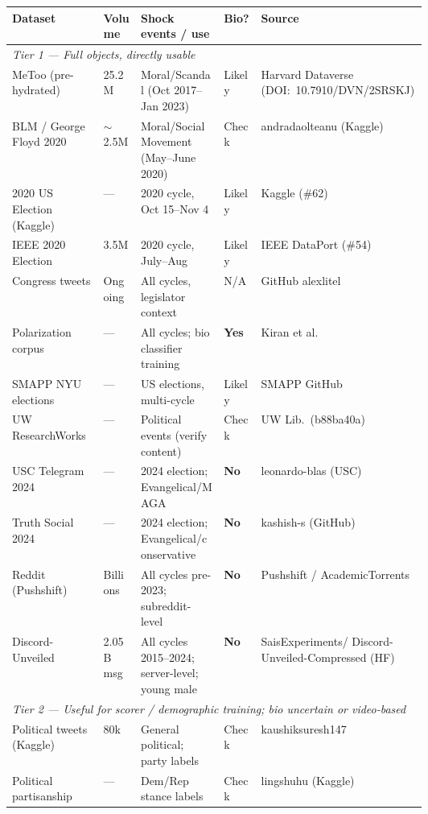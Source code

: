 \documentclass[11pt]{article}
\begin{document}
\begin{center}
{\small\setlength{\tabcolsep}{4pt}%
\begin{tabularx}{\linewidth}{p{0.22\linewidth}p{0.09\linewidth}p{0.20\linewidth}p{0.09\linewidth}X}
\toprule
\textbf{Dataset} & \textbf{Volume} & \textbf{Shock events / use} & \textbf{Bio?} & \textbf{Source} \\
\midrule
\multicolumn{5}{l}{\small\textit{Tier 1 --- Full objects, directly usable}} \\[2pt]
MeToo (pre-hydrated) & 25.2M & Moral/Scandal (Oct 2017--Jan 2023) & Likely & Harvard Dataverse (DOI:~10.7910/DVN/2SRSKJ) \\
BLM / George Floyd 2020 & $\sim$2.5M & Moral/Social Movement (May--June 2020) & Check & andradaolteanu (Kaggle) \\
2020 US Election (Kaggle) & --- & 2020 cycle, Oct 15--Nov 4 & Likely & Kaggle (\#62) \\
IEEE 2020 Election & 3.5M & 2020 cycle, July--Aug & Likely & IEEE DataPort (\#54) \\
Congress tweets & Ongoing & All cycles, legislator context & N/A & GitHub alexlitel \\
Polarization corpus & --- & All cycles; bio classifier training & \textbf{Yes} & Kiran et al. \\
SMAPP NYU elections & --- & US elections, multi-cycle & Likely & SMAPP GitHub \\
UW ResearchWorks & --- & Political events (verify content) & Check & UW Lib.\ (b88ba40a) \\
USC Telegram 2024 & --- & 2024 election; Evangelical/MAGA & \textbf{No} & leonardo-blas (USC) \\
Truth Social 2024 & --- & 2024 election; Evangelical/conservative & \textbf{No} & kashish-s (GitHub) \\
Reddit (Pushshift) & Billions & All cycles pre-2023; subreddit-level & \textbf{No} & Pushshift / AcademicTorrents \\
Discord-Unveiled & 2.05B msg & All cycles 2015--2024; server-level; young male & \textbf{No} & SaisExperiments/ Discord-Unveiled-Compressed (HF) \\[4pt]
\multicolumn{5}{l}{\small\textit{Tier 2 --- Useful for scorer / demographic training; bio uncertain or video-based}} \\[2pt]
Political tweets (Kaggle) & 80k & General political; party labels & Check & kaushiksuresh147 \\
Political partisanship & --- & Dem/Rep stance labels & Check & lingshuhu (Kaggle) \\

\end{tabularx}}
\end{center}
\end{document}
